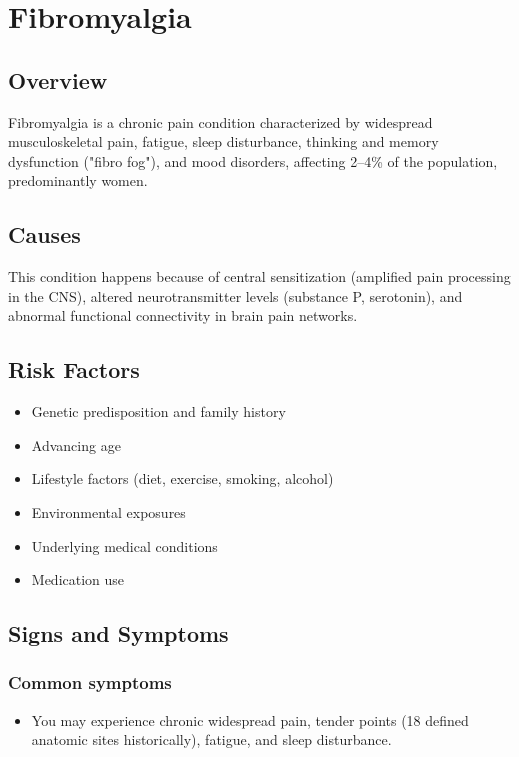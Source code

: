 \chapter{Fibromyalgia}
\label{sec:Fibromyalgia}

\section{Overview}
Fibromyalgia is a chronic pain condition characterized by widespread musculoskeletal pain, fatigue, sleep disturbance, thinking and memory dysfunction ("fibro fog"), and mood disorders, affecting 2--4\% of the population, predominantly women.
\section{Causes}
This condition happens because of central sensitization (amplified pain processing in the CNS), altered neurotransmitter levels (substance P, serotonin), and abnormal functional connectivity in brain pain networks.     
\section{Risk Factors}

\begin{itemize}[noitemsep]
  \item Genetic predisposition and family history
  \item Advancing age
  \item Lifestyle factors (diet, exercise, smoking, alcohol)
  \item Environmental exposures
  \item Underlying medical conditions
  \item Medication use
\end{itemize}
\section{Signs and Symptoms}

\subsection{Common symptoms}
\begin{itemize}[noitemsep]
  \item You may experience chronic widespread pain, tender points (18 defined anatomic sites historically), fatigue, and sleep disturbance. 
  \end{itemize}

